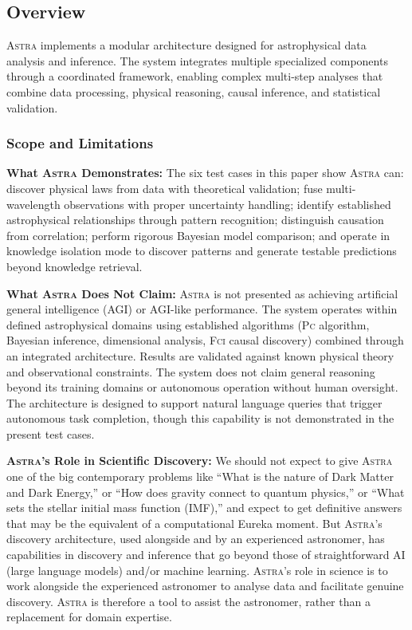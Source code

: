 \documentclass[fleqn,usenatbib]{mnras}
\newcommand{\astra}{\textsc{Astra}\xspace}
\newcommand{\fci}{\textsc{Fci}\xspace}
\newcommand{\pc}{\textsc{Pc}\xspace}
\begin{document}
\subsection{Overview}
\label{sec:methods:overview}

\astra implements a modular architecture designed for astrophysical data analysis and inference.
The system integrates multiple specialized components through a coordinated framework, enabling complex multi-step analyses that combine data processing, physical reasoning, causal inference, and statistical validation.

\subsubsection{Scope and Limitations}
\label{sec:scope}

\textbf{What \astra Demonstrates:}
The six test cases in this paper show \astra can: discover physical laws from data with theoretical validation; fuse multi-wavelength observations with proper uncertainty handling; identify established astrophysical relationships through pattern recognition; distinguish causation from correlation; perform rigorous Bayesian model comparison; and operate in knowledge isolation mode to discover patterns and generate testable predictions beyond knowledge retrieval.

\textbf{What \astra Does Not Claim:}
\astra is not presented as achieving artificial general intelligence (AGI) or AGI-like performance.
The system operates within defined astrophysical domains using established algorithms (\pc algorithm, Bayesian inference, dimensional analysis, \fci causal discovery) combined through an integrated architecture.
Results are validated against known physical theory and observational constraints.
The system does not claim general reasoning beyond its training domains or autonomous operation without human oversight.
The architecture is designed to support natural language queries that trigger autonomous task completion, though this capability is not demonstrated in the present test cases.

\textbf{\astra's Role in Scientific Discovery:}
We should not expect to give \astra one of the big contemporary problems like ``What is the nature of Dark Matter and Dark Energy,'' or ``How does gravity connect to quantum physics,'' or ``What sets the stellar initial mass function (IMF),'' and expect to get definitive answers that may be the equivalent of a computational Eureka moment.
But \astra's discovery architecture, used alongside and by an experienced astronomer, has capabilities in discovery and inference that go beyond those of straightforward AI (large language models) and/or machine learning.
\astra's role in science is to work alongside the experienced astronomer to analyse data and facilitate genuine discovery.
\astra is therefore a tool to assist the astronomer, rather than a replacement for domain expertise.
\end{document}
